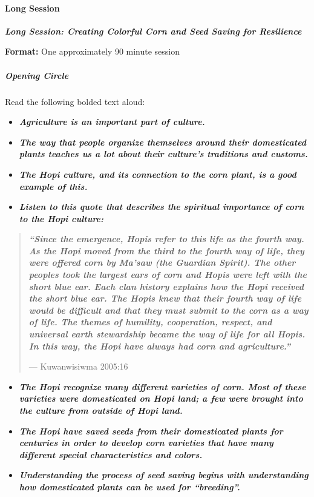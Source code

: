\documentclass[12pt,]{article}
\providecommand{\tightlist}{%
  \setlength{\itemsep}{0pt}\setlength{\parskip}{0pt}}
\let\oldparagraph\paragraph
\renewcommand{\paragraph}[1]{\oldparagraph{#1}\mbox{}}
\let\oldsubparagraph\subparagraph
\renewcommand{\subparagraph}[1]{\oldsubparagraph{#1}\mbox{}}
\begin{document}
\hypertarget{long-session-3}{%
\paragraph{Long Session}\label{long-session-3}}

\textbf{\emph{Long Session: Creating Colorful Corn and Seed Saving for Resilience}}

\textbf{Format:} One approximately 90 minute session

\hypertarget{opening-circle}{%
\subparagraph{Opening Circle}\label{opening-circle}}

Read the following bolded text aloud:

\begin{itemize}
\tightlist
\item
  \textbf{\emph{Agriculture is an important part of culture. }}
\item
  \textbf{\emph{The way that people organize themselves around their domesticated plants teaches us a lot about their culture's traditions and customs. }}
\item
  \textbf{\emph{The Hopi culture, and its connection to the corn plant, is a good example of this. }}
\item
  \textbf{\emph{Listen to this quote that describes the spiritual importance of corn to the Hopi culture:}}
\end{itemize}

\begin{quote}
\textbf{\emph{``Since the emergence, Hopis refer to this life as the fourth way. As the Hopi moved from the third to the fourth way of life, they were offered corn by Ma'saw (the Guardian Spirit). The other peoples took the largest ears of corn and Hopis were left with the short blue ear. Each clan history explains how the Hopi received the short blue ear. The Hopis knew that their fourth way of life would be difficult and that they must submit to the corn as a way of life. The themes of humility, cooperation, respect, and universal earth stewardship became the way of life for all Hopis. In this way, the Hopi have always had corn and agriculture.''}}

--- Kuwanwisiwma 2005:16
\end{quote}

\begin{itemize}
\tightlist
\item
  \textbf{\emph{The Hopi recognize many different varieties of corn. Most of these varieties were domesticated on Hopi land; a few were brought into the culture from outside of Hopi land.}}
\item
  \textbf{\emph{The Hopi have saved seeds from their domesticated plants for centuries in order to develop corn varieties that have many different special characteristics and colors. }}
\item
  \textbf{\emph{Understanding the process of seed saving begins with understanding how domesticated plants can be used for ``breeding''.}}
\end{itemize}
\end{document}
